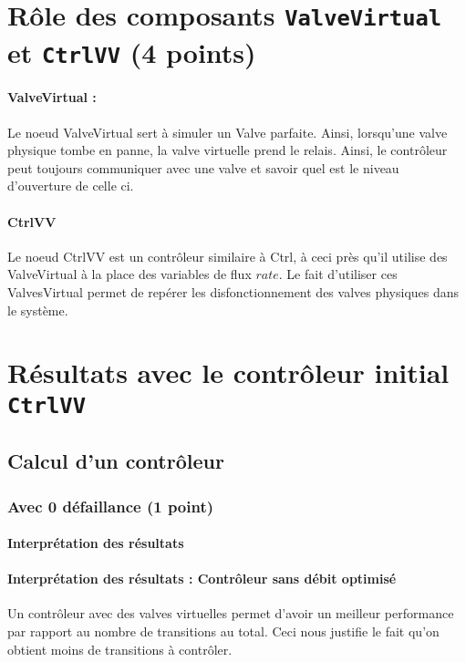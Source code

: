 \documentclass[a4paper]{book}
\begin{document}
\section{Rôle des composants {\tt ValveVirtual} et {\tt CtrlVV} (4 points)}
\paragraph{ValveVirtual : }
Le noeud ValveVirtual sert à simuler un Valve parfaite. Ainsi, lorsqu'une valve physique tombe en panne, la valve virtuelle prend le relais. Ainsi, le contrôleur peut toujours communiquer avec une valve et savoir quel est le niveau d'ouverture de celle ci.

\paragraph{CtrlVV}
Le noeud CtrlVV est un contrôleur similaire à Ctrl, à ceci près qu'il utilise des ValveVirtual à la place des variables de flux $rate$.
Le fait d'utiliser ces ValvesVirtual permet de repérer les disfonctionnement des valves physiques dans le système.

\section{Résultats avec le contrôleur initial {\tt CtrlVV}}
\subsection{Calcul d'un contrôleur}
\subsubsection{Avec 0 défaillance (1 point)}


%
%
%
\paragraph{Interprétation des résultats}
\paragraph{Interprétation des résultats : Contrôleur sans débit optimisé}
Un contrôleur avec des valves virtuelles permet d'avoir un meilleur performance par rapport au nombre de transitions au total.
Ceci nous justifie le fait qu'on obtient moins de transitions à contrôler.
\end{document}
